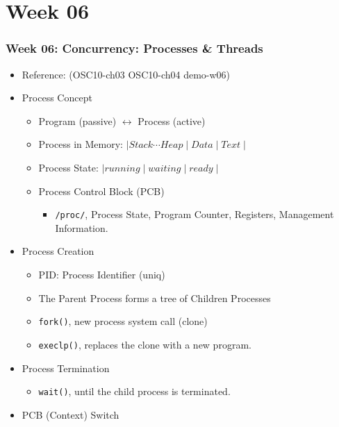 \documentclass[xcolor=table, notheorems, hyperref={pdfpagelabels=false}]{beamer}
\begin{document}
\section{Week 06}
\begin{frame}[fragile]
\frametitle{Week 06: Concurrency: Processes \& Threads}
\begin{itemize}
\item Reference: (OSC10-ch03 OSC10-ch04 demo-w06)
\item Process Concept
\begin{itemize}
\item Program (passive) $\leftrightarrow$ Process (active)
\item Process in Memory: $ \mid Stack \cdots Heap \mid Data \mid Text \mid $
\item Process State: $ \mid running \mid waiting \mid ready \mid $
\item Process Control Block (PCB)
\begin{itemize}
\item \texttt{/proc/}, Process State, Program Counter, Registers, Management Information.
\end{itemize}
\end{itemize}
\item Process Creation
\begin{itemize}
\item PID: Process Identifier (uniq)
\item The Parent Process forms a tree of Children Processes
\item \texttt{fork()}, new process system call (clone)
\item \texttt{execlp()}, replaces the clone with a new program.
\end{itemize}
\item Process Termination
\begin{itemize}
\item \texttt{wait()}, until the child process is terminated.
\end{itemize}
\item PCB (Context) Switch
\end{itemize}
\end{frame}

\end{document}
